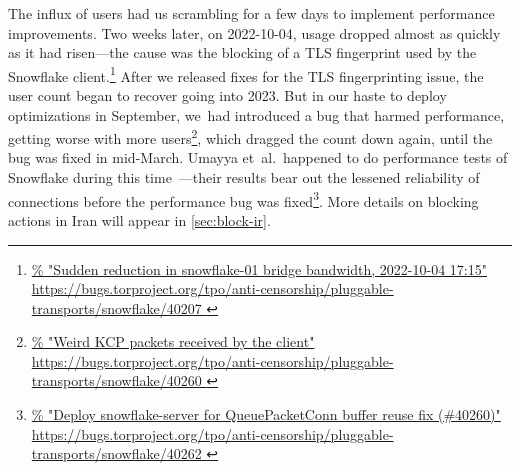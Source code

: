 \documentclass[letterpaper,twocolumn]{article}
\newlength{\urlfootnotesize}
\newcommand{\urlfootnote}[1]{\footnote{
\raggedright\fontsize{\urlfootnotesize}{\urlfootnotesize}\selectfont\url{#1}
}}
\begin{document}
The influx of users had us scrambling for a few days
to implement performance improvements.
Two weeks later, on \mbox{2022-10-04},
usage dropped almost as quickly as it had risen---the
cause was the blocking of a TLS fingerprint
used by the Snowflake client.\urlfootnote{
https://bugs.torproject.org/tpo/anti-censorship/pluggable-transports/snowflake/40207
}
After we released fixes for the TLS fingerprinting issue,
the user count began to recover going into 2023.
But in our haste to deploy optimizations in September,
we~had introduced a bug that harmed performance,
getting worse with more users\urlfootnote{
https://bugs.torproject.org/tpo/anti-censorship/pluggable-transports/snowflake/40260
},
which dragged the count down again,
until the bug was fixed in mid-March.
Umayya et~al.\ happened to do performance tests of Snowflake
during this time~\cite[\S 4.6]{Umayya2023a}---their results
bear out the lessened reliability of connections
before the performance bug was fixed\urlfootnote{
https://bugs.torproject.org/tpo/anti-censorship/pluggable-transports/snowflake/40262
}.
More details on blocking actions in Iran
will appear in \autoref{sec:block-ir}.
\end{document}
